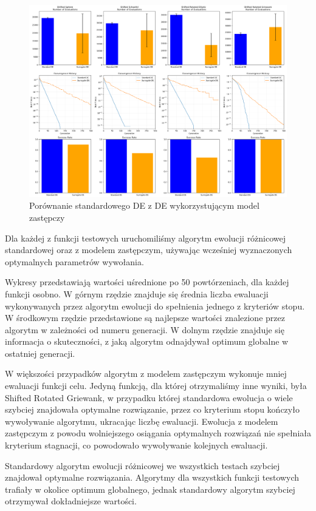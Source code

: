 \documentclass{article}
\begin{document}
\begin{figure}[H]
    \centering
    \includegraphics[width=\textwidth]{comprehensive_results.png}
    \caption{Porównanie standardowego DE z DE wykorzystującym model zastępczy}
    \label{fig:comprehensive_results}
\end{figure}

Dla każdej z funkcji testowych uruchomiliśmy algorytm ewolucji różnicowej standardowej oraz z modelem zastępczym, używając wcześniej wyznaczonych optymalnych parametrów wywołania.

Wykresy przedstawiają wartości uśrednione po 50 powtórzeniach, dla każdej funkcji osobno. W górnym rzędzie znajduje się średnia liczba ewaluacji wykonywanych przez algorytm ewolucji do spełnienia jednego z kryteriów stopu. W środkowym rzędzie przedstawione są najlepsze wartości znalezione przez algorytm w zależności od numeru generacji. W dolnym rzędzie znajduje się informacja o skuteczności, z jaką algorytm odnajdywał optimum globalne w ostatniej generacji. 

W większości przypadków algorytm z modelem zastępczym wykonuje mniej ewaluacji funkcji celu. Jedyną funkcją, dla której otrzymaliśmy inne wyniki, była Shifted Rotated Griewank, w przypadku której standardowa ewolucja o wiele szybciej znajdowała optymalne rozwiązanie, przez co kryterium stopu kończyło wywoływanie algorytmu, ukracając liczbę ewaluacji. Ewolucja z modelem zastępczym z powodu wolniejszego osiągania optymalnych rozwiązań nie spełniała kryterium stagnacji, co powodowało wywoływanie kolejnych ewaluacji. 

Standardowy algorytm ewolucji różnicowej we wszystkich testach szybciej znajdował optymalne rozwiązania.
Algorytmy dla wszystkich funkcji testowych trafiały w okolice optimum globalnego, jednak standardowy algorytm szybciej otrzymywał dokładniejsze wartości.
\end{document}
